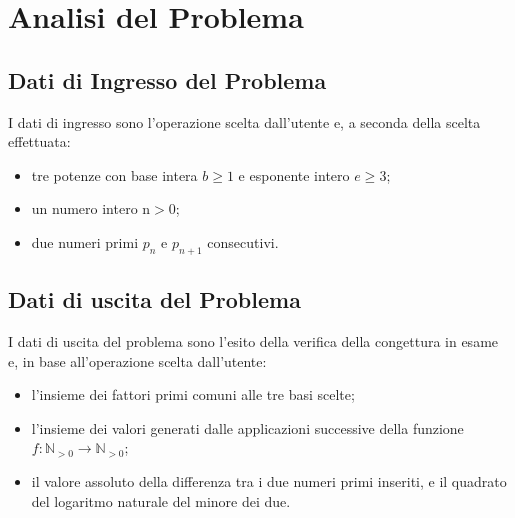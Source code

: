 \documentclass[10pt]{report}
\begin{document}
\newpage

\section{Analisi del Problema}
\subsection{Dati di Ingresso del Problema}
I dati di ingresso sono l'operazione scelta dall'utente e, a seconda della scelta effettuata:

\begin{itemize}
\item tre potenze con base intera $b\ge1$ e esponente intero $e\ge3$;
\item un numero intero n$>0$;
\item due numeri primi $p_n$ e $p_{n+1}$ consecutivi.
\end{itemize}


\subsection{Dati di uscita del Problema}
I dati di uscita del problema sono l'esito della verifica della congettura in esame e, in base all'operazione scelta dall'utente:

\begin{itemize}
\item l'insieme dei fattori primi comuni alle tre basi scelte; 
\item l'insieme dei valori generati dalle applicazioni successive della funzione\\ $f:\mathbb{N}_{>0}\longrightarrow\mathbb{N}_{>0}$; 
\item il valore assoluto della differenza tra i due numeri primi inseriti, e il quadrato del logaritmo naturale del minore dei due. 
\end{itemize}
\end{document}
